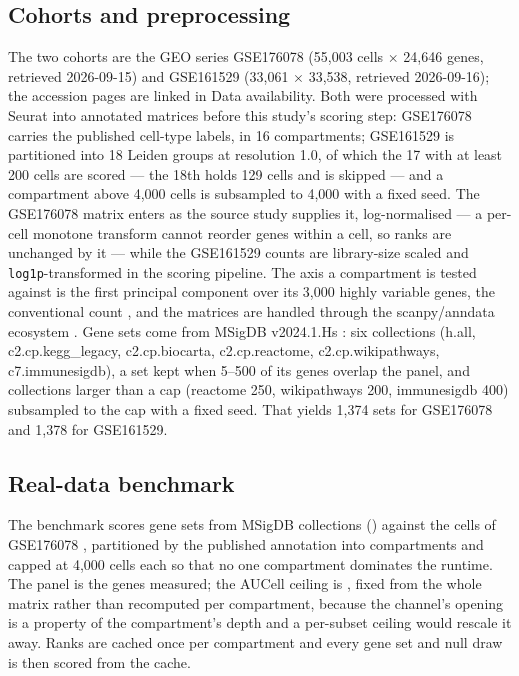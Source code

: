 \documentclass[11pt]{article}
\newcommand{\code}[1]{\texttt{#1}}
\begin{document}
\subsection{Cohorts and preprocessing}
\label{sec:cohorts}
The two cohorts are the GEO series GSE176078 \citep{wu2021}
(55{,}003 cells $\times$ 24{,}646 genes, retrieved 2026-09-15) and GSE161529
\citep{pal2021} (33{,}061 $\times$ 33{,}538, retrieved 2026-09-16); the
accession pages are linked in Data availability. Both were processed with
Seurat \citep{hao2021} into annotated matrices before this study's scoring
step: GSE176078 carries the published cell-type labels, in 16 compartments;
GSE161529 is partitioned into 18 Leiden groups at resolution 1.0, of which
the 17 with at least 200 cells are scored --- the 18th holds 129 cells and is
skipped --- and a compartment above 4{,}000 cells is subsampled to 4{,}000
with a fixed seed. The
GSE176078 matrix enters as the source study supplies it, log-normalised ---
a per-cell monotone transform cannot reorder genes within a cell, so ranks
are unchanged by it --- while the GSE161529 counts are library-size scaled
and \code{log1p}-transformed in the scoring pipeline. The axis a compartment
is tested against is the first principal component over its 3{,}000 highly
variable genes, the conventional count \citep{luecken2019}, and the matrices
are handled through the scanpy/anndata
ecosystem \citep{wolf2018}. Gene sets come from MSigDB v2024.1.Hs
\citep{liberzon2015}: six collections (h.all, c2.cp.kegg\_legacy,
c2.cp.biocarta, c2.cp.reactome, c2.cp.wikipathways, c7.immunesigdb), a set
kept when 5--500 of its genes overlap the panel, and collections larger than
a cap (reactome 250, wikipathways 200, immunesigdb 400) subsampled to the cap
with a fixed seed. That yields 1{,}374 sets for GSE176078 and 1{,}378 for
GSE161529.

\subsection{Real-data benchmark}
The benchmark scores \benchSets{} gene sets from \benchCollections{} MSigDB
collections (\benchCollectionNames{}) \citep{liberzon2015} against the
\benchCells{} cells of GSE176078 \citep{wu2021}, partitioned by the published
annotation into \benchGroups{} compartments and capped at 4{,}000 cells each so
that no one compartment dominates the runtime. The panel is the \benchGenes{}
genes measured; the AUCell ceiling is \benchMaxRank{}, fixed from the whole
matrix rather than recomputed per compartment, because the channel's opening is
a property of the compartment's depth and a per-subset ceiling would rescale it
away. Ranks are cached once per compartment and every gene set and null draw is
then scored from the cache.
\end{document}
